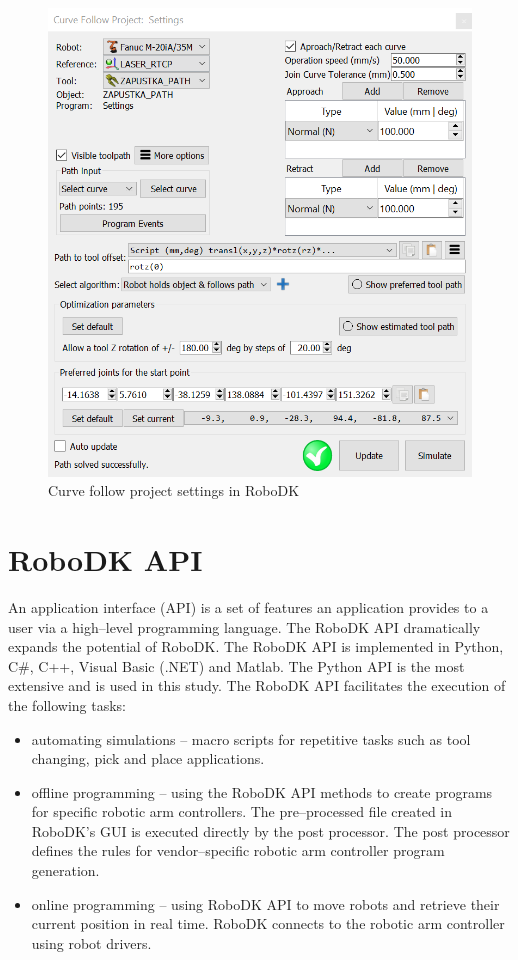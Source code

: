 \begin{figure}[h]
    \centering
    \includegraphics[width=0.9\linewidth]{img/curve_follow_settings.PNG}
    \caption{Curve follow project settings in RoboDK}
    \label{fig:curvefollow}
\end{figure}

\section{RoboDK API}

An application interface (API) is a set of features an application provides to a user via a high--level programming language. The RoboDK API dramatically expands the potential of RoboDK. The RoboDK API is implemented in Python, C\#, C++, Visual Basic (.NET) and Matlab.  The Python API is the most extensive and is used in this study. The RoboDK API facilitates the execution of the following tasks:

\begin{itemize}
    
 \item automating simulations -- macro scripts for repetitive tasks such as tool changing, pick and place applications.

 \item offline programming -- using the RoboDK API methods to create programs for specific robotic arm controllers. The pre--processed  file created in RoboDK's GUI is executed directly by the post processor. The post processor defines the rules for vendor--specific robotic arm controller program generation. 

 \item online programming -- using RoboDK API to move robots and retrieve their current position in real time. RoboDK connects to the robotic arm controller using robot drivers.

\end{itemize}

